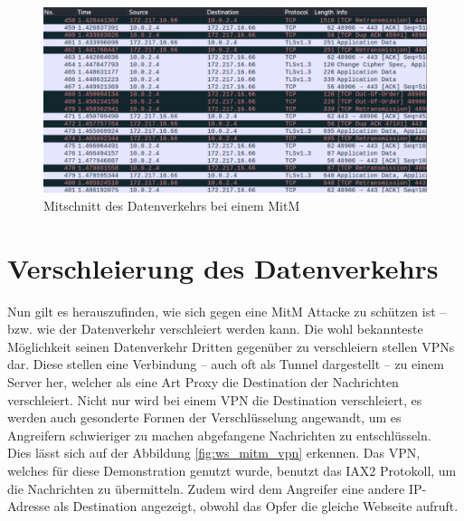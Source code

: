 \begin{figure}
    \includegraphics[width=\linewidth]{img/ws_no_vpn.png}
    \caption{Mitschnitt des Datenverkehrs bei einem \ac{MitM}}
    \label{fig:ws_mitm}
\end{figure}
\pagebreak
\section{Verschleierung des Datenverkehrs}

Nun gilt es herauszufinden, wie sich gegen eine \ac{MitM} Attacke zu schützen ist – bzw. wie der Datenverkehr verschleiert werden kann. 
Die wohl bekannteste Möglichkeit seinen Datenverkehr Dritten gegenüber zu verschleiern stellen \ac{VPN}s dar. Diese stellen eine Verbindung – auch oft als Tunnel dargestellt – zu einem Server her, welcher als eine Art Proxy die Destination der Nachrichten verschleiert. Nicht nur wird bei einem VPN die Destination verschleiert, es werden auch gesonderte Formen der Verschlüsselung angewandt, um es Angreifern schwieriger zu machen abgefangene Nachrichten zu entschlüsseln.\\ 
Dies lässt sich auf der Abbildung \ref{fig:ws_mitm_vpn} erkennen. Das VPN, welches für diese Demonstration genutzt wurde, benutzt das IAX2 Protokoll, um die Nachrichten zu übermitteln. Zudem wird dem Angreifer eine andere IP-Adresse als Destination angezeigt, obwohl das Opfer die gleiche Webseite aufruft. 

